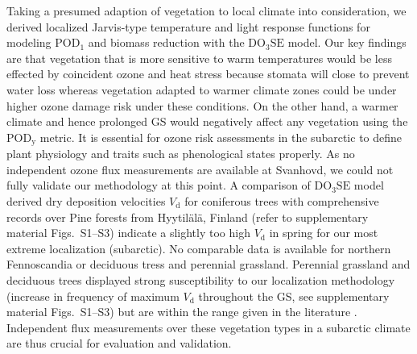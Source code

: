 \documentclass[bg, manuscript]{copernicus}
\begin{document}
Taking a presumed adaption of vegetation to local climate into consideration, we derived localized Jarvis-type temperature and light response functions for modeling $\mathrm{POD_1}$ and biomass reduction with the $\mathrm{DO_3SE}$ model. Our key findings are that vegetation that is more sensitive to warm temperatures would be less effected by coincident ozone and heat stress because stomata will close to prevent water loss whereas vegetation adapted to warmer climate zones could be under higher ozone damage risk under these conditions. On the other hand, a warmer climate and hence prolonged GS would negatively affect any vegetation using the $\mathrm{POD_y}$ metric. It is essential for ozone risk assessments in the subarctic to define plant physiology and traits such as phenological states properly. As no independent ozone flux measurements are available at Svanhovd, we could not fully validate our methodology at this point. 
A comparison of $\mathrm{DO_3SE}$ model derived dry deposition velocities $V_\mathrm{d}$ for coniferous trees with comprehensive records over Pine forests from Hyytilälä, Finland \citep{BER:Keronen2003} (refer to supplementary material Figs.~S1--S3) indicate a slightly too high $V_\mathrm{d}$ in spring for our most extreme localization (subarctic). No comparable data is available for northern Fennoscandia or deciduous tress and perennial grassland. Perennial grassland and deciduous trees displayed strong susceptibility to our localization methodology (increase in frequency of maximum $V_\mathrm{d}$ throughout the GS, see supplementary material Figs.~S1--S3) but are within the range given in the literature \citep[e.g.][]{JGR:Jacob1992,AE:Padro1996,RG:Clifton2020}. Independent flux measurements over these vegetation types in a subarctic climate are thus crucial for evaluation and validation. 
\end{document}
